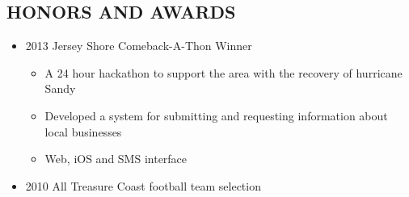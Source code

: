 \documentclass{res}
\begin{document}
\begin{resume}
\section{HONORS AND AWARDS}          
    \begin{itemize}
        \item 2013 Jersey Shore Comeback-A-Thon Winner
            \begin{itemize}
                \item A 24 hour hackathon to support the area with the recovery of hurricane Sandy
                \item Developed a system for submitting and requesting information about local businesses
                \item Web, iOS and SMS interface
            \end{itemize}
        \item 2010 All Treasure Coast football team selection
    \end{itemize}
 
 
\end{resume}
\end{document}
